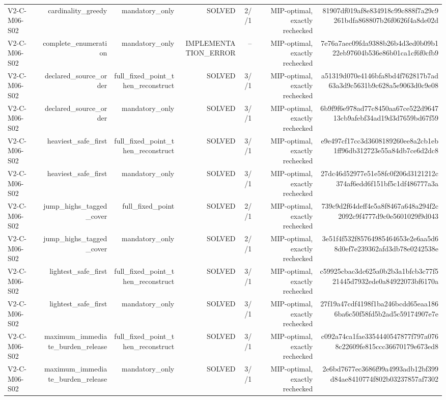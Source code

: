 {\begin{longtable}{lrrrrrr}
V2-C-M06-S02 & cardinality\_greedy & mandatory\_only & SOLVED & 2//1 & MIP-optimal, exactly rechecked & 81907df019af8e834918c99c888f7a29c9261bdfa868807b26f0626f4a8de02d \\
V2-C-M06-S02 & complete\_enumeration & mandatory\_only & IMPLEMENTATION\_ERROR & -- & MIP-optimal, exactly rechecked & 7e76a7aec09fda9388b26b4d3ed0b09b122eb97604b536e86b01ca1cf6f0cfb9 \\
V2-C-M06-S02 & declared\_source\_order & full\_fixed\_point\_then\_reconstruct & SOLVED & 3//1 & MIP-optimal, exactly rechecked & a51319d070e4146bfa8bd4f762817b7ad63a3d9c5631b9c628a5e9063d0c9e08 \\
V2-C-M06-S02 & declared\_source\_order & mandatory\_only & SOLVED & 3//1 & MIP-optimal, exactly rechecked & 6b9f9f6e978ad77c8450aa67ce522d964713cb9afebf34ad19d3d7659bd67f59 \\
V2-C-M06-S02 & heaviest\_safe\_first & full\_fixed\_point\_then\_reconstruct & SOLVED & 3//1 & MIP-optimal, exactly rechecked & e9e497cf17cc3d3608189260ee8a2cb1eb1ff96db312723e55a84db7ce6d2dc8 \\
V2-C-M06-S02 & heaviest\_safe\_first & mandatory\_only & SOLVED & 3//1 & MIP-optimal, exactly rechecked & 27dc46d52977e51e58fc0f206d3121212c374af6edd6f151bf5c1df486777a3a \\
V2-C-M06-S02 & jump\_highs\_tagged\_cover & full\_fixed\_point & SOLVED & 2//1 & MIP-optimal, exactly rechecked & 739c9d2f64deff4e5a8f8467a648a294f2c2092c9f4777d9c0e5601029f9d043 \\
V2-C-M06-S02 & jump\_highs\_tagged\_cover & mandatory\_only & SOLVED & 2//1 & MIP-optimal, exactly rechecked & 3e51f4f532f85764985464653e2e6aa5d68d0ef7e239362afd3db78e0242538e \\
V2-C-M06-S02 & lightest\_safe\_first & full\_fixed\_point\_then\_reconstruct & SOLVED & 3//1 & MIP-optimal, exactly rechecked & c59925cbac3dc625a0b2b3a1bfcb3c77f521445d7932ede0a84922073bf6170a \\
V2-C-M06-S02 & lightest\_safe\_first & mandatory\_only & SOLVED & 3//1 & MIP-optimal, exactly rechecked & 27f19a47cdf4198f1ba246bcdd65eaa1866ba6c50f58fd5b2ad5c59174907e7e \\
V2-C-M06-S02 & maximum\_immediate\_burden\_release & full\_fixed\_point\_then\_reconstruct & SOLVED & 3//1 & MIP-optimal, exactly rechecked & c092a74ca1fae3354440547877f797a0768c22609fe815ccc36670179e673ed8 \\
V2-C-M06-S02 & maximum\_immediate\_burden\_release & mandatory\_only & SOLVED & 3//1 & MIP-optimal, exactly rechecked & 2e6bd7677ec3686f99a4993adb12bf399d84ae8410774f802b03237857af7302 \\

\end{longtable}}
